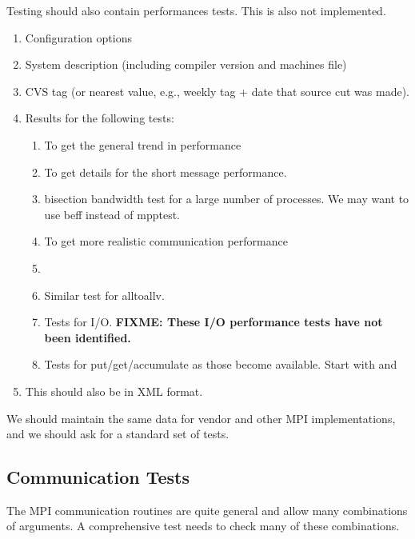 \documentclass{article}
\def\fixme#1{\marginpar{FIXME:}\textbf{FIXME: #1}}
\begin{document}
Testing should also contain performances tests.  This is also not implemented.
\begin{enumerate}
\item Configuration options
\item System description (including compiler version and machines file)
\item CVS tag (or nearest value, e.g., weekly tag + date that source
cut was made).
\item Results for the following tests:
    \begin{enumerate}
    \item {} To get the general trend in performance
    \item {} To get details for the short message
performance. 
    \item bisection bandwidth test for a large number of processes.
    We may want to use beff instead of mpptest.
    \item {} To get more
    realistic communication performance
    \item {} 
    \item Similar test for alltoallv. 
    \item Tests for I/O. \fixme{These I/O performance tests have not
    been identified.}
    \item Tests for put/get/accumulate as those become available.
    Start with  and 
    \end{enumerate}
\item This should also be in XML format.


\end{enumerate}
We should maintain the same data for vendor and other MPI
implementations, and we should ask for a standard set of tests.  

\subsection{Communication Tests}
\label{sec:testing-comm}

The MPI communication routines are quite general and allow many
combinations of arguments.  A comprehensive test needs to check many
of these combinations.  
\end{document}
